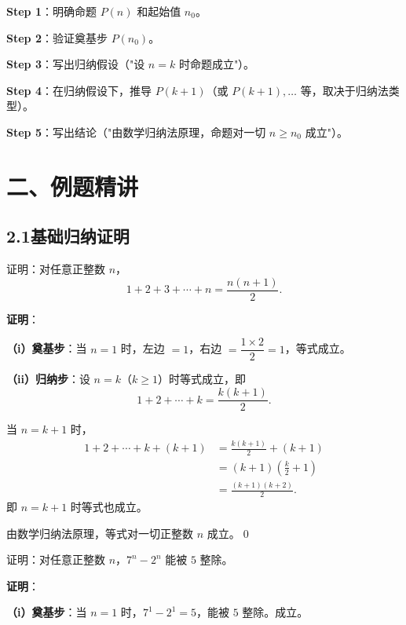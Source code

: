 \documentclass[12pt, a4paper]{ctexart}
\begin{document}
\begin{tipbox}[归纳法证明的一般步骤]
\textbf{Step 1}：明确命题 $P(n)$ 和起始值 $n_0$。

\textbf{Step 2}：验证奠基步 $P(n_0)$。

\textbf{Step 3}：写出归纳假设（"设 $n=k$ 时命题成立"）。

\textbf{Step 4}：在归纳假设下，推导 $P(k+1)$（或 $P(k+1), \ldots$ 等，取决于归纳法类型）。

\textbf{Step 5}：写出结论（"由数学归纳法原理，命题对一切 $n \geq n_0$ 成立"）。
\end{tipbox}

\section*{\textcolor{examorange}{二、例题精讲}}

\subsection*{2.1\quad 基础归纳证明}

\begin{examplebox}[【例题1】证明求和公式]
证明：对任意正整数 $n$，
\[ 1 + 2 + 3 + \cdots + n = \frac{n(n+1)}{2}. \]
\end{examplebox}

\textbf{证明}：

\textbf{（i）奠基步}：当 $n=1$ 时，左边 $= 1$，右边 $= \dfrac{1 \times 2}{2} = 1$，等式成立。

\textbf{（ii）归纳步}：设 $n = k$（$k \geq 1$）时等式成立，即
\[ 1 + 2 + \cdots + k = \frac{k(k+1)}{2}. \]

当 $n = k+1$ 时，
\begin{align*}
1 + 2 + \cdots + k + (k+1) &= \frac{k(k+1)}{2} + (k+1) \\
&= (k+1)\left(\frac{k}{2} + 1\right) \\
&= \frac{(k+1)(k+2)}{2}.
\end{align*}
即 $n = k+1$ 时等式也成立。

由数学归纳法原理，等式对一切正整数 $n$ 成立。\qed

\begin{examplebox}[【例题2】证明整除性]
证明：对任意正整数 $n$，$7^n - 2^n$ 能被 $5$ 整除。
\end{examplebox}

\textbf{证明}：

\textbf{（i）奠基步}：当 $n=1$ 时，$7^1 - 2^1 = 5$，能被 $5$ 整除。成立。
\end{document}
